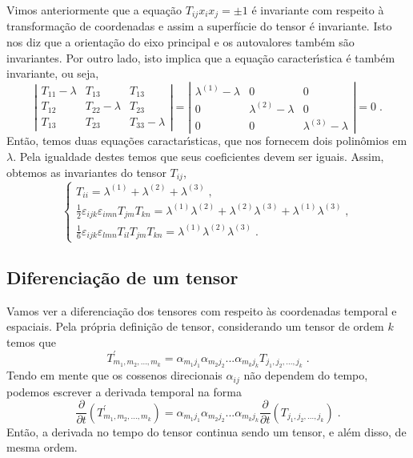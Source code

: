    Vimos anteriormente que a equa\c{c}\~ao $T_{ij}x_i x_j = \pm 1$
\'e invariante com respeito \`a transforma\c{c}\~ao de coordenadas
e assim a superf\'i{\i}cie do tensor \'e invariante. Isto nos diz
que a orienta\c{c}\~ao do eixo principal e os autovalores tamb\'em
s\~ao invariantes. Por outro lado, isto implica que a
equa\c{c}\~ao caracter\'{\i}stica \'e tamb\'em invariante, ou
seja,
\begin{equation} \left|
\begin{array}{ccc}
   T_{11}-\lambda & T_{13} & T_{13} \\
   T_{12} & T_{22}-\lambda & T_{23} \\
   T_{13} & T_{23} & T_{33}-\lambda
\end{array} \right|=\left|
\begin{array}{ccc}
   \lambda^{(1)}-\lambda & 0 & 0 \\
   0 & \lambda^{(2)}-\lambda & 0 \\
   0 & 0 & \lambda^{(3)}-\lambda
\end{array} \right|=0\;.
   \label{auto_caract_inv}
\end{equation}
Ent\~ao, temos duas equa\c{c}\~oes caractar\'{\i}sticas, que nos
fornecem dois polin\^omios em $\lambda$. Pela igualdade destes
temos que seus coeficientes devem ser iguais. Assim, obtemos as
invariantes do tensor $T_{ij}$,
\begin{equation} \left\{
\begin{array}{l}
T_{ii}=\lambda^{(1)}+\lambda^{(2)}+\lambda^{(3)}\;, \\
\frac{1}{2}\varepsilon_{ijk}\varepsilon_{imn}T_{jm}T_{kn}=\lambda^{(1)}\lambda^{(2)}+\lambda^{(2)}\lambda^{(3)}+\lambda^{(1)}\lambda^{(3)}\;, \\
\frac{1}{6}\varepsilon_{ijk}\varepsilon_{lmn}T_{il}T_{jm}T_{kn}=\lambda^{(1)}\lambda^{(2)}\lambda^{(3)}\;.
\end{array} \right.
\end{equation}


\subsection{Diferencia\c{c}\~ao de um tensor}

Vamos ver a diferencia\c{c}\~ao dos tensores com respeito \`as
coordenadas temporal e espaciais. Pela pr\'opria defini\c{c}\~ao
de tensor, considerando um tensor de ordem $k$ temos que
\begin{equation}
T^{'}_{m_1,m_2,...,m_k}=\alpha_{m_1 j_1}\alpha_{m_2
j_2}...\alpha_{m_k j_k}T_{j_1,j_2,...,j_k} \;.
\label{tensor_mudanca}
\end{equation}
Tendo em mente que os cossenos direcionais $\alpha_{ij}$ n\~ao dependem do
tempo, podemos escrever a derivada temporal na forma
\begin{equation}
\frac{\partial}{\partial t}(T^{'}_{m_1,m_2,...,m_k})=\alpha_{m_1
j_1}\alpha_{m_2 j_2}...\alpha_{m_k j_k} \frac{\partial}{\partial
t}(T_{j_1,j_2,...,j_k}) \;.
\end{equation}
Ent\~ao, a derivada no tempo do tensor continua sendo um tensor, e
al\'em disso, de mesma ordem.

